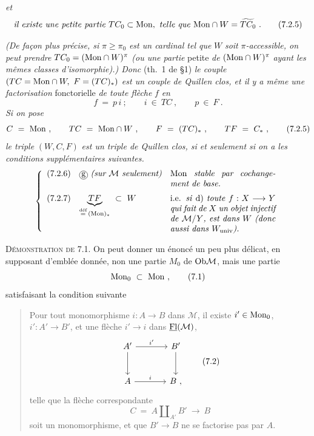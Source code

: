 
\textit{et}
\[
\text{\textit{il existe une petite partie} } TC_0 \subset \Mon, \text{ \textit{telle que} } \Mon \cap W = \widetilde{TC_0}\ . \tag*{(7.2.5)} %
\]

\textit{(De façon plus précise, si} $\pi \geq \pi_0$ \textit{est un cardinal tel que} $W$ \textit{soit} $\pi$\textit{-accessible, on peut prendre} $TC_0 = (\mathrm{Mon} \cap W)^{\pi}$ \textit{(ou une partie} petite \textit{de} $(\mathrm{Mon} \cap W)^{\pi}$ \textit{ayant les mêmes classes d'isomorphie).) Donc} (th.~1 de §1) \textit{le couple} $(TC = \mathrm{Mon} \cap W,\ F = (TC)_*)$ \textit{est un couple de Quillen clos, et il y a même une factorisation} fonctorielle \textit{de toute flèche} $f$ \textit{en}
\[
f \ = \ p\, i \ ; \qquad i \ \in \ TC \ , \qquad p \ \in \ F \ . \tag*{(7.2.4)}
\]
\textit{Si on pose}
\[
C \ = \ \mathrm{Mon} \ , \qquad TC \ = \ \mathrm{Mon} \cap W \ , \qquad F \ = \ (TC)_* \ , \qquad TF \ = \ C_* \ , \tag*{(7.2.5)}
\]
\textit{le triple} $(W, C, F)$ \textit{est un triple de Quillen clos, si et seulement si on a les conditions supplémentaires suivantes.}
\[
\left\{
\begin{array}{lll}
\text{(7.2.6)} & \cercle{g}\ \text{\textit{(sur $\mathcal{M}$ seulement)}} & \parbox[t]{0.36\textwidth}{Mon \textit{stable par cochangement de base.}} \\[4ex]
\text{(7.2.7)} & \underbrace{TF}_{\overset{\text{déf}}{=}\,(\Mon)_*} \ \subset \ W & \parbox[t]{0.36\textwidth}{i.e. \textit{si} d) \textit{toute} $f : X \longrightarrow Y$ \textit{qui fait de} $X$ \textit{un objet injectif de} $\mathcal{M}/Y$\textit{, est dans} $W$ \textit{(donc aussi dans} $W_{\mathrm{univ}}$\textit{).}}
\end{array}
\right.
\]


\textsc{Démonstration de} 7.1. On peut donner un énoncé un peu plus délicat, en supposant d'emblée donnée, non une partie $M_0$ de $\mathrm{Ob} \mathcal{M}$, mais une partie
\[
\mathrm{Mon}_0 \ \subset \ \mathrm{Mon} \ , \tag*{(7.1)}
\]
satisfaisant la condition suivante

\begin{quote}
Pour tout monomorphisme $i : A \longrightarrow B$ dans $\mathcal{M}$, il existe $i' \in \mathrm{Mon}_0$, $i' : A' \longrightarrow B'$, et une flèche $i' \longrightarrow i$ dans $\underline{\mathrm{Fl}}(\mathcal{M})$,
\[
\begin{tikzcd}[row sep=large, column sep=large]
A' \arrow[r, "{i'}"] \arrow[d] & B' \arrow[d] \\
A \arrow[r, "i"] & B \ ,
\end{tikzcd}
\tag*{(7.2)}
\]
telle que la flèche correspondante
\[
C \ = \ A \amalg_{A'} B' \ \longrightarrow \ B
\]
soit un monomorphisme, et que $B' \longrightarrow B$ ne se factorise pas par $A$.
\end{quote}

